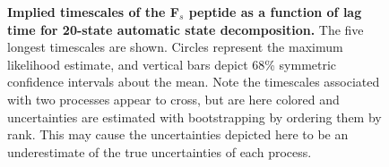 
\begin{figure}[tb]
  \begin{center}
  \end{center}
  \caption{{\bf Implied timescales of the F$_s$ peptide as a function of lag time for 20-state automatic state decomposition.} 
   The five longest timescales are shown.  
   Circles represent the maximum likelihood estimate, and vertical bars depict 68\% symmetric confidence intervals about the mean.
   Note the timescales associated with two processes appear to cross, but are here colored and uncertainties are estimated with bootstrapping by ordering them by rank.
   This may cause the uncertainties depicted here to be an underestimate of the true uncertainties of each process.
  }
  \label{figure:fs-peptide-timescales}
\end{figure}

